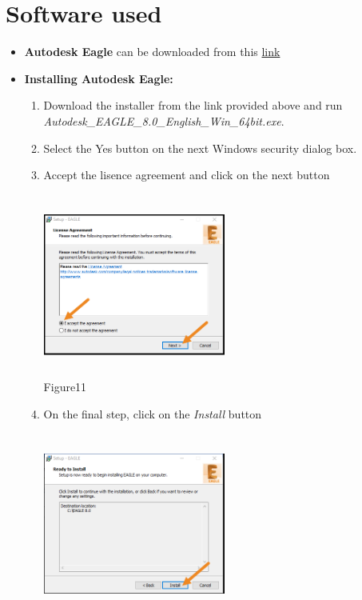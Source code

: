 \documentclass[a4paper,12pt,oneside]{book}
\begin{document}
\section{Software used}
\begin{itemize}
  \item \textbf{Autodesk Eagle} can be downloaded from this \href{https://www.autodesk.com/products/eagle/free-download}{link}
  \item \textbf{Installing Autodesk Eagle:}
  		\begin{enumerate}
  			\item Download the installer from the link provided above and run \textit{Autodesk\_EAGLE\_8.0\_English\_Win\_64bit.exe}. 
  			\item Select the Yes button on the next Windows security dialog box.
  			\item Accept the lisence agreement and click on the next button
  				\begin{center}
  					\includegraphics[width=6cm, height=6cm]{Images/E1}\\
  					Figure11
  				\end{center}
  			\item On the final step, click on the \textit{Install} button
				\begin{center}
					\includegraphics[width=6cm, height=6cm]{Images/E2}\\

\end{center}
\end{enumerate}
\end{itemize}
\end{document}
